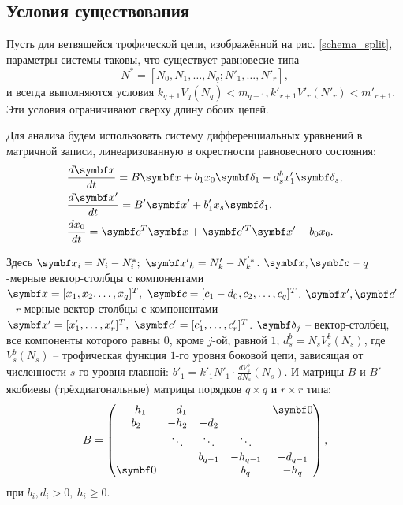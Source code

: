 \subsection{Условия существования}
Пусть для ветвящейся трофической цепи, изображённой на рис. \ref{schema_split}, параметры системы таковы, что существует равновесие типа 
\[ N^* = [ N_0, N_1, \dots, N_q; N'_1,\dots, N'_r ], \]
и всегда выполняются условия \( k_{q+1} V_q(N_q) < m_{q+1}, k'_{r+1} V'_r(N'_r) < m'_{r+1} \). Эти условия ограничивают сверху длину обоих цепей.

Для анализа будем использовать систему дифференциальных уравнений в матричной записи, линеаризованную в окрестности равновесного состояния:
\begin{equation} \label{double_matrix_system}
    \begin{split}
        & \frac{d \mb{x}}{dt} = B \mb{x} + b_1 x_0 \mb{\delta_1} - d^b_s x'_1 \mb{\delta_s}, \\
        & \frac{d \mb{x'}}{dt}= B' \mb{x'} + b'_1 x_s \mb{\delta_1}, \\
        & \frac{d x_0}{dt} = \mb{c}^T \mb{x} + \mb{c'}{}^T \mb{x'} - b_0 x_0.
    \end{split}
\end{equation}

Здесь \( \mb{x}_i = N_i - N^*_i; ~ \mb{x'}_k = N'_k - N^{'*}_k \). \( \mb{x}, \mb{c} \) -- \(q\)-мерные вектор-столбцы с компонентами \(\mb{x} = [x_1, x_2, \dots, x_q]^T, ~ \mb{c} = [c_1 - d_0, c_2, \dots, c_q]^T\). \( \mb{x'}, \mb{c'} \) -- \(r\)-мерные вектор-столбцы с компонентами \( \mb{x'} = [x'_1, \dots, x'_r]^T, ~ \mb{c'} = [c'_1, \dots, c'_r]^T \). \( \mb{\delta_j} \) -- вектор-столбец, все компоненты которого равны \(0\), кроме \(j\)-ой, равной \(1\); \(d^b_s = N_s V^b_s(N_s)\), где \( V^b_s(N_s) \) -- трофическая функция \(1\)-го уровня боковой цепи, зависящая от численности \(s\)-го уровня главной: \( b'_1 = k'_1 N'_1 \cdot \frac{d V^b_s}{d N_s} (N_s) \). И матрицы \(B\) и \(B'\) -- якобиевы (трёхдиагональные) матрицы порядков \(q \times q\) и \( r \times r \) типа:
\begin{equation*}
    B = \left( \begin{matrix}
        -h_1 & -d_1 &         &         & \mb{0}    \\
        b_2 & -h_2 & -d_2 \\
            & \ddots & \ddots & \ddots \\
            &        & b_{q-1} & -h_{q-1} & -d_{q-1} \\
        \mb{0}&      &         & b_q     & -h_q
    \end{matrix} \right),
\end{equation*}
при \(b_i, d_i > 0, ~ h_i \geq 0\).

